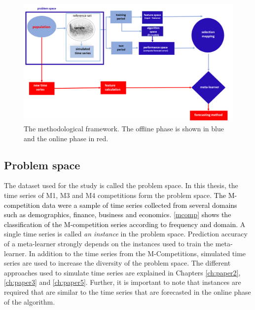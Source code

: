 \documentclass{monashthesis}
\begin{document}
\begin{figure}[h]

{\centering \includegraphics[width=1.05\linewidth,height=0.4\textheight]{chap1metalearning} 

}

\caption{The methodological framework. The offline phase is shown in blue and the online phase in red.}\label{fig:frameworkch1}
\end{figure}

\hypertarget{problem-space}{%
\subsection{Problem space}\label{problem-space}}

The dataset used for the study is called the problem space. In this thesis, the time series of M1, M3 \autocite{makridakis2000m3} and M4 competitions \autocite{makridakis2018m4} form the problem space. \textcolor{black}{The M-competition data were a sample of time series collected from several domains such as demographics, finance, business and economics.} \autoref{mcomp} \textcolor{black}{shows the classification of the M-competition series according to frequency and domain.} A single time series is called \emph{an instance} in the problem space. Prediction accuracy of a meta-learner strongly depends on the instances used to train the meta-learner. In addition to the time series from the M-Competitions, simulated time series are used to increase the diversity of the problem space. The different approaches used to simulate time series are explained in Chapters \ref{ch:paper2}, \ref{ch:paper3} and \ref{ch:paper5}. Further, it is important to note that instances are required that are similar to the time series that are forecasted in the online phase of the algorithm.
\end{document}
